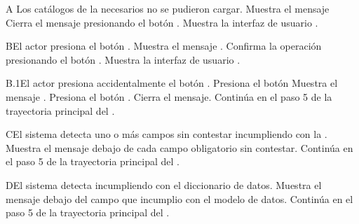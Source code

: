     \begin{UCtrayectoriaA}{A}{ Los catálogos de la  necesarios no se pudieron cargar.}
    	\UCpaso Muestra el mensaje 
    	\UCpaso[\UCactor] Cierra el mensaje presionando el botón .
    	\UCpaso Muestra la interfaz de usuario .
    \end{UCtrayectoriaA}

    \begin{UCtrayectoriaA}{B}{El actor presiona el botón .}
    	\UCpaso Muestra el mensaje .
    	\UCpaso[\UCactor] Confirma la operación presionando el botón .
    	\UCpaso Muestra la interfaz de usuario .
    \end{UCtrayectoriaA}

    \begin{UCtrayectoriaA}{B.1}{El actor presiona accidentalmente el botón .}
    	\UCpaso[\UCactor] Presiona el botón 
    	\UCpaso Muestra el mensaje .
    	\UCpaso[\UCactor] Presiona el botón .
    	\UCpaso Cierra el mensaje.
    	\UCpaso Continúa en el paso 5 de la trayectoria principal del .
    \end{UCtrayectoriaA}

    \begin{UCtrayectoriaA}{C}{El sistema detecta uno o más campos sin contestar incumpliendo con la .}
    	\UCpaso Muestra el mensaje  debajo de cada campo obligatorio sin contestar.
    	\UCpaso Continúa en el paso 5 de la trayectoria principal del .
    \end{UCtrayectoriaA}

    \begin{UCtrayectoriaA}{D}{El sistema detecta incumpliendo con el diccionario de datos.}
    	\UCpaso Muestra el mensaje  debajo del campo que incumplio con el modelo de datos.
    	\UCpaso Continúa en el paso 5 de la trayectoria principal del .
    \end{UCtrayectoriaA}

